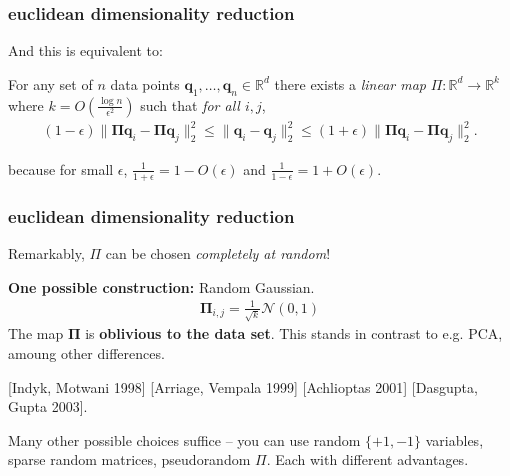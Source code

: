 \documentclass[compress,handout]{beamer}
\newcommand{\bs}[1]{\boldsymbol{#1}}
\newcommand{\bv}[1]{\mathbf{#1}}
\newcommand{\R}{\mathbb{R}}
\begin{document}
\begin{frame}
	\frametitle{euclidean dimensionality reduction}
	And this is equivalent to:
		\begin{lemma}
		For any set of $n$ data points $\bv{q}_1,\ldots, \bv{q}_n \in \R^d$ there exists a \emph{linear map} $\Pi: \R^d \rightarrow \R^k$ where $k = O\left(\frac{\log n}{\epsilon^2}\right)$ such that \emph{for all $i,j$},
		\begin{align*}
			(1-\epsilon)\|\bs{\Pi}\bv{q}_i - \bs{\Pi}\bv{q}_j\|_2^{{{2}}} \leq \|\bv{q}_i - \bv{q}_j\|_2^{{{2}}} \leq (1+\epsilon)\|\bs{\Pi}\bv{q}_i - \bs{\Pi}\bv{q}_j\|_2^{{{2}}}.
		\end{align*}
	\end{lemma}
	because for small $\epsilon$, $\frac{1}{1+\epsilon} = 1 - O(\epsilon)$ and $\frac{1}{1-\epsilon} = 1 + O(\epsilon)$.
\end{frame}

\begin{frame}
	\frametitle{euclidean dimensionality reduction}
	\begin{center}
	Remarkably, $\Pi$ can be chosen \emph{completely at random}!
	\end{center}
	\textbf{One possible construction:} Random Gaussian.
	\begin{align*}
		\bs{\Pi}_{i,j} = \frac{1}{\sqrt{k}} \mathcal{N}(0,1)
	\end{align*}
	The map $\bs{\Pi}$ is \textbf{\alert{oblivious to the data set}}. This stands in contrast to e.g. PCA, amoung other differences.
	
	[Indyk, Motwani 1998] [Arriage, Vempala 1999] [Achlioptas 2001] [Dasgupta, Gupta 2003].
	
	Many other possible choices suffice -- you can use random $\{+1,-1\}$ variables, sparse random matrices, pseudorandom $\Pi$. Each with different advantages. 
\end{frame}
\end{document}
